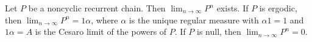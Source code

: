 Let $P$ be a noncyclic recurrent chain. Then $\lim_{n \to \infty} P^n$ exists.
If $P$ is ergodic, then $\lim_{n \to \infty} P^n = 1\alpha$, where $\alpha$ is the unique regular measure with $\alpha 1 = 1$ and $1\alpha = A$ is the Cesaro limit of the powers of $P$.
If $P$ is null, then $\lim_{n \to \infty} P^n = 0$.
